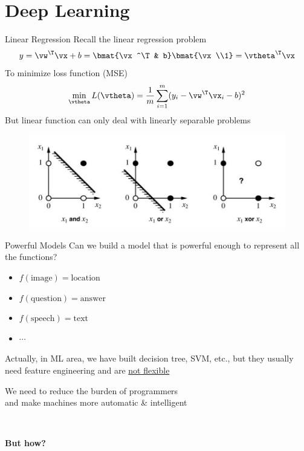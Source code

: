 \documentclass{../TexTemplate/myslide}
\begin{document}
\section{Deep Learning}
\begin{frame}
\sectionpage
\end{frame}

\begin{frame}{Linear Regression}
Recall the linear regression problem
\[y=\vw^\T\vx+b=\bmat{\vx^\T & b}\bmat{\vx\\1}=\vtheta^\T\vx\]
To minimize loss function (MSE)
\[\min_{\vtheta} L(\vtheta)=\frac{1}{m}\sum_{i=1}^m(y_i-\vw^\T\vx_i-b)^2\]
But linear function can only deal with linearly separable problems
\begin{figure}
\centering
\includegraphics[width=0.8\linewidth]{fig/linearly-separable.jpeg}
\end{figure}
\end{frame}

\begin{frame}{Powerful Models}
Can we build a model that is powerful enough to represent all the functions?
\begin{itemize}
	\item $f(\text{image})=\text{location}$
	\item $f(\text{question})=\text{answer}$
	\item $f(\text{speech})=\text{text}$
	\item $\cdots$
\end{itemize}
\pause
Actually, in ML area, we have built decision tree, SVM, etc., but they usually need feature engineering and are \underline{not flexible}
\end{frame}

\begin{frame}
\begin{center}
\large We need to reduce the burden of programmers\\
and make machines more automatic \& intelligent
\end{center}
\pause\quad\\\bigskip
\begin{center}
\large \textbf{But how?}
\end{center}
\end{frame}
\end{document}
